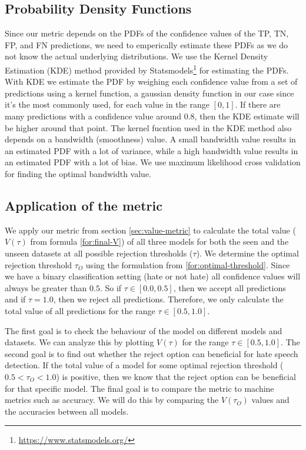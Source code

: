 \subsection{Probability Density Functions}
Since our metric depends on the PDFs of the confidence values of the TP, TN, FP, and FN predictions, we need to emperically estimate these PDFs as we do not know the actual underlying distributions.
%
We use the Kernel Density Estimation (KDE) method provided by Statsmodels\footnote{\url{https://www.statsmodels.org/}} for estimating the PDFs.
%
With KDE we estimate the PDF by weighing each confidence value from a set of predictions using a kernel function, a gaussian density function in our case since it's the most commonly used, for each value in the range $[0, 1]$.
%
If there are many predictions with a confidence value around $0.8$, then the KDE estimate will be higher around that point.
%
The kernel fucntion used in the KDE method also depends on a bandwidth (smoothness) value.
%
A small bandwidth value results in an estimated PDF with a lot of variance, while a high bandwidth value results in an estimated PDF with a lot of bias.
%
We use maximum likelihood cross validation for finding the optimal bandwidth value.
%

\subsection{Application of the metric}
We apply our metric from section \ref{sec:value-metric} to calculate the total value ($V(\tau)$ from formula \ref{for:final-V}) of all three models for both the seen and the unseen datasets at all possible rejection thresholds ($\tau$).
%
We determine the optimal rejection threshold $\tau_O$ using the formulation from \ref{for:optimal-threshold}.
%
Since we have a binary classification setting (hate or not hate) all confidence values will always be greater than $0.5$.
%
So if $\tau \in [0.0, 0.5]$, then we accept all predictions and if $\tau = 1.0$, then we reject all predictions.
%
Therefore, we only calculate the total value of all predictions for the range $\tau \in [0.5, 1.0]$.
%

%
The first goal is to check the behaviour of the model on different models and datasets.
%
We can analyze this by plotting $V(\tau)$ for the range $\tau \in [0.5, 1.0]$.
%
The second goal is to find out whether the reject option can beneficial for hate speech detection.
%
If the total value of a model for some optimal rejection threshold ($0.5 < \tau_O < 1.0$) is positive, then we know that the reject option can be beneficial for that specific model.
%
The final goal is to compare the metric to machine metrics such as accuracy.
%
We will do this by comparing the $V(\tau_O)$ values and the accuracies between all models.


